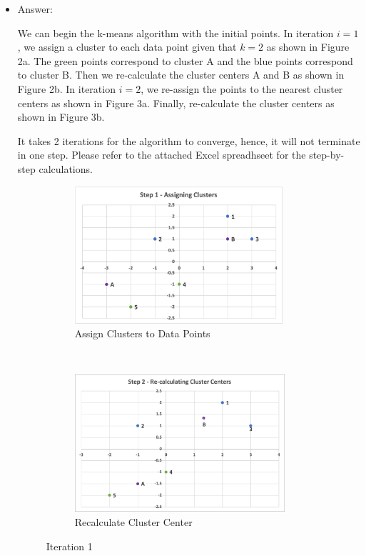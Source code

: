 \documentclass[twoside,10pt]{article}
\begin{document}
	\begin{itemize}
   \item Answer:
   
   We can begin the k-means algorithm with the initial points. In iteration $i=1$, we assign a cluster to each data point given that $k=2$ as shown in Figure 2a. The green points correspond to cluster A and the blue points correspond to cluster B. Then we re-calculate the cluster centers A and B as shown in Figure 2b. In iteration $i=2$, we re-assign the points to the nearest cluster centers as shown in Figure 3a. Finally, re-calculate the cluster centers as shown in Figure 3b.
   
   It takes 2 iterations for the algorithm to converge, hence, it will not terminate in one step. Please refer to the attached Excel spreadhseet for the step-by-step calculations.

	
	\begin{figure}[t!]
    \centering
    \begin{subfigure}[t]{0.5\textwidth}
        \centering
        \includegraphics[height=2in]{Images/Step1.png}
        \caption{Assign Clusters to Data Points}
    \end{subfigure}%
    ~ 
    \begin{subfigure}[t]{0.5\textwidth}
        \centering
        \includegraphics[height=2in]{Images/Step2.png}
        \caption{Recalculate Cluster Center}
    \end{subfigure}
    \caption{Iteration 1}
\end{figure}


\end{itemize}
\end{document}
